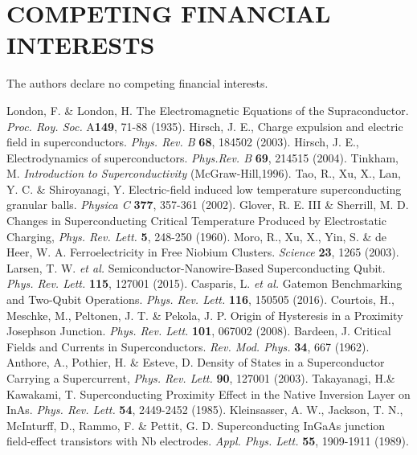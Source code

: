 \documentclass[prl,twocolumn,reprint,graphicx,showpacs,superscriptaddress,floatfix]{revtex4-1}
\begin{document}
\section{COMPETING FINANCIAL INTERESTS}
The authors declare no competing financial interests.


\begin{thebibliography}{50}
	London, F. \& London, H. The Electromagnetic Equations of the Supraconductor. \emph{Proc. Roy. Soc.} A\textbf{149}, 71-88 (1935).
	Hirsch, J. E., Charge expulsion and electric field in superconductors. \emph{Phys. Rev. B} \textbf{68}, 184502 (2003).
	Hirsch, J. E., Electrodynamics of superconductors. \emph{Phys.Rev. B} \textbf{69}, 214515 (2004).
	Tinkham, M. \emph{Introduction to Superconductivity} (McGraw-Hill,1996).
	 Tao, R.,  Xu, X., Lan, Y. C. \&  Shiroyanagi, Y. Electric-field induced low temperature superconducting granular balls. \emph{Physica C} \textbf{377}, 357-361 (2002).
	Glover, R. E. III \& Sherrill, M. D. Changes in Superconducting Critical Temperature Produced by Electrostatic Charging, \emph{Phys. Rev. Lett.} \textbf{5}, 248-250 (1960). 
	Moro, R., Xu, X., Yin, S. \&  de Heer, W. A. Ferroelectricity in Free Niobium Clusters. \emph{Science} \textbf{23}, 1265 (2003).
	Larsen, T. W. \emph{et al.} Semiconductor-Nanowire-Based Superconducting Qubit. \emph{Phys. Rev. Lett.} \textbf{115}, 127001 (2015).
	Casparis, L. \emph{et al.} Gatemon Benchmarking and Two-Qubit Operations. \emph{Phys. Rev. Lett.} \textbf{116}, 150505 (2016).
Courtois, H., Meschke, M., Peltonen, J. T. \& Pekola, J. P. Origin of Hysteresis in a Proximity Josephson Junction. \emph{Phys. Rev. Lett.} \textbf{101}, 067002 (2008).
	Bardeen, J. Critical Fields and Currents in Superconductors. \emph{Rev. Mod. Phys.} \textbf{34}, 667 (1962).
Anthore, A., Pothier, H. \& Esteve, D. Density of States in a Superconductor Carrying a Supercurrent, \emph{Phys. Rev. Lett.} \textbf{90}, 127001 (2003).
	Takayanagi, H.\& Kawakami, T. Superconducting Proximity Effect in the Native Inversion Layer on InAs. \emph{Phys. Rev. Lett.} \textbf{54}, 2449-2452 (1985).
	Kleinsasser, A. W., Jackson, T. N., McInturff, D., Rammo, F. \& Pettit, G. D. Superconducting InGaAs junction field-effect transistors with Nb electrodes. \emph{Appl. Phys. Lett.} \textbf{55}, 1909-1911 (1989).

\end{thebibliography}
\end{document}
